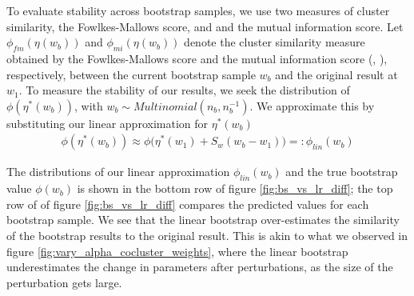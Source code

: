 \documentclass[a4paper]{article}
\begin{document}
To evaluate stability across bootstrap samples, we use two measures of cluster similarity,
the Fowlkes-Mallows score, and and the mutual information score. Let $\phi_{fm}(\eta(w_b))$ and
$\phi_{mi}(\eta(w_b))$ denote the cluster similarity measure obtained by the Fowlkes-Mallows score
and the mutual information score (\cite{fm_score}, \cite{mi_score}), respectively, between the current bootstrap sample $w_b$ and the original
result at $w_1$. To measure the stability of our results,
we seek the distribution of $\phi(\eta^*(w_b))$, with
$w_b \sim Multinomial(n_b, n_b^{-1})$. We approximate this by substituting our linear approximation
for $\eta^*(w_b)$
\begin{align}
  \phi(\eta^*(w_b)) \approx \phi\Big(\eta^*(w_1) + S_w(w_b - w_1)\Big) =: \phi_{lin}(w_b)
  \label{eq:bs_fm_approx}
\end{align}

The distributions of our linear approximation $\phi_{lin}(w_b)$ and the true bootstrap value $\phi(w_b)$
is shown in the bottom row of figure \ref{fig:bs_vs_lr_diff}; the top
row of of figure \ref{fig:bs_vs_lr_diff} compares the predicted values for each bootstrap sample.
We see that the linear bootstrap over-estimates
the similarity of the bootstrap results to the original result.
This is akin to what we observed in figure \ref{fig:vary_alpha_cocluster_weights},
where the linear bootstrap underestimates the change in parameters after
perturbations, as the size of the perturbation gets large.
\end{document}

